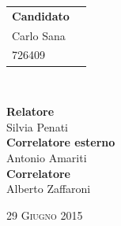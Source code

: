 \begin{titlepage}
 \vspace{8.7cm}

\begin{minipage}{0.4\textwidth}
\begin{flushleft} \large

\begin{tabular}{l r }
\textbf{Candidato} \\

\textsf{Carlo Sana}  &
\\
\textsf{726409} & 

\end{tabular}

\end{flushleft}

\vfill
\end{minipage}
~
\begin{minipage}{0.4\textwidth}
\begin{flushright} \large
\textbf{Relatore} \\
\textsf{Silvia Penati}
\\[0.3cm]
\textbf{Correlatore esterno} \\
\textsf{Antonio Amariti}
\\[0.3cm]
\textbf{Correlatore}\\
\textsf{Alberto Zaffaroni}
\end{flushright}
\end{minipage}

\vfill


{\large \textsc{29 Giugno 2015}}


 
%

\end{titlepage}